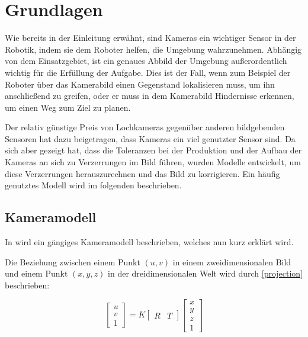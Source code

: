 \chapter{Grundlagen}
\label{chap:grundlagen}

Wie bereits in der Einleitung erwähnt, sind Kameras ein wichtiger Sensor in der Robotik, indem sie dem Roboter helfen, die Umgebung wahrzunehmen. Abhängig von dem Einsatzgebiet, ist ein genaues Abbild der Umgebung außerordentlich wichtig für die Erfüllung der Aufgabe. Dies ist der Fall, wenn zum Beispiel der Roboter über das Kamerabild einen Gegenstand lokalisieren muss, um ihn anschließend zu greifen, oder er muss in dem Kamerabild Hindernisse erkennen, um einen Weg zum Ziel zu planen.

Der relativ günstige Preis von Lochkameras gegenüber anderen bildgebenden Sensoren hat dazu beigetragen, dass Kameras ein viel genutzter Sensor sind. Da sich aber gezeigt hat, dass die Toleranzen bei der Produktion und der Aufbau der Kameras an sich zu Verzerrungen im Bild führen, wurden Modelle entwickelt, um diese Verzerrungen herauszurechnen und das Bild zu korrigieren. Ein häufig genutztes Modell wird im folgenden beschrieben.

\section{Kameramodell} %
\label{sec:kameramodell}
In \cite{Zhang} wird ein gängiges Kameramodell beschrieben, welches nun kurz erklärt wird.

Die Beziehung zwischen einem Punkt $(u, v)$ in einem zweidimensionalen Bild und einem Punkt $(x, y, z)$ in der dreidimensionalen Welt wird durch \autoref{projection} beschrieben:

\begin{equation}
\begin{bmatrix}
 	u \\
 	v \\
 	1
\end{bmatrix} = K 
\begin{bmatrix}
   	R & T
\end{bmatrix} 
\begin{bmatrix}
   	x \\
   	y \\
   	z \\
   	1
\end{bmatrix} \label{projection}
\end{equation}

